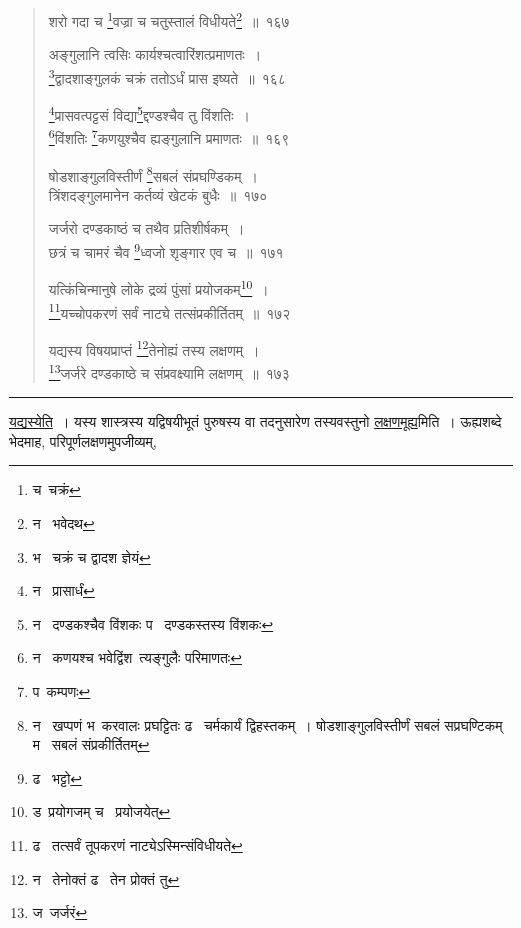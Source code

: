 \documentclass[11pt, openany]{book}
\begin{document}
\newpage

\begin{quote}
{\na शरो गदा च \renewcommand{\thefootnote}{1}\footnote{च\textendash\ चक्रं}वज्रा च चतुस्तालं विधीयते\renewcommand{\thefootnote}{2}\footnote{न \textendash\ भवेदथ}~॥~१६७

अङ्गुलानि त्वसिः कार्यश्चत्वारिंशत्प्रमाणतः~।\\
\renewcommand{\thefootnote}{3}\footnote{भ \textendash\ चक्रं च द्वादश ज्ञेयं}द्वादशाङ्गुलकं चक्रं ततोऽर्धं प्रास इष्यते~॥~१६८

\renewcommand{\thefootnote}{4}\footnote{न \textendash\ प्रासार्धं}प्रासवत्पट्टसं विद्या\renewcommand{\thefootnote}{5}\footnote{न \textendash\ दण्डकश्चैव विंशकः प \textendash\ दण्डकस्तस्य विंशकः}द्दण्डश्चैव तु विंशतिः~।\\
\renewcommand{\thefootnote}{6}\footnote{न \textendash\ कणयश्च भवेद्विंश\textendash\ त्यङ्गुलैः परिमाणतः}विंशतिः \renewcommand{\thefootnote}{7}\footnote{प\textendash\ कम्पणः}कणयुश्चैव ह्यङ्गुलानि प्रमाणतः~॥~१६९

षोडशाङ्गुलविस्तीर्णं \renewcommand{\thefootnote}{8}\footnote{न \textendash\ खप्पणं भ\textendash\ करवालः प्रघट्टितः ढ \textendash\ चर्मकार्यं द्विहस्तकम्~। षोडशाङ्गुलविस्तीर्णं सबलं सप्रघण्टिकम् म \textendash\ सबलं संप्रकीर्तितम्}सबलं संप्रघण्डिकम्~।\\
त्रिंशदङ्गुलमानेन कर्तव्यं खेटकं बुधैः~॥~१७०

जर्जरो दण्डकाष्ठं च तथैव प्रतिशीर्षकम्~।\\
छत्रं च चामरं चैव \renewcommand{\thefootnote}{9}\footnote{ढ \textendash\ भट्टो}ध्वजो शृङ्गार एव च~॥~१७१

यत्किंचिन्मानुषे लोके द्रव्यं पुंसां प्रयोजकम्\renewcommand{\thefootnote}{10}\footnote{ड\textendash\ प्रयोगजम् च \textendash\ प्रयोजयेत्}~।\\
\renewcommand{\thefootnote}{11}\footnote{ढ \textendash\ तत्सर्वं तूपकरणं नाट्येऽस्मिन्संविधीयते}यच्चोपकरणं सर्वं नाट्ये तत्संप्रकीर्तितम्~॥~१७२

यद्यस्य विषयप्राप्तं \renewcommand{\thefootnote}{12}\footnote{न \textendash\ तेनोक्तं ढ \textendash\ तेन प्रोक्तं तु}तेनोह्यं तस्य लक्षणम्~।\\
\renewcommand{\thefootnote}{13}\footnote{ज\textendash\ जर्जरं}जर्जरे दण्डकाष्ठे च संप्रवक्ष्यामि लक्षणम्~॥~१७३}
\end{quote}

\hrule

\vspace{2mm}
\underline{यद्यस्येति}~। यस्य शास्त्रस्य यद्विषयीभूतं पुरुषस्य वा तदनुसारेण तस्यवस्तुनो \underline{लक्षणमूह्य}मिति~। ऊह्यशब्दे भेदमाह, परिपूर्णलक्षणमुपजीव्यम्,
\end{document}
